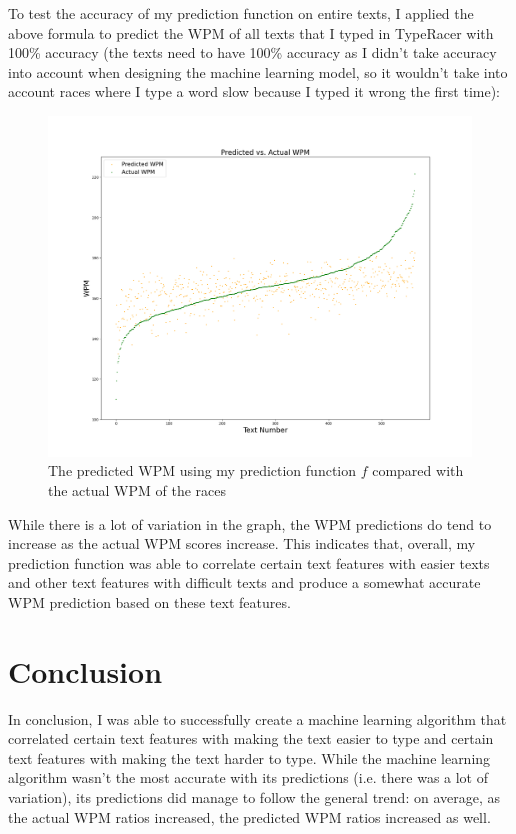 \documentclass[12pt]{article}
\begin{document}
To test the accuracy of my prediction function on entire texts, I applied the above formula to predict the WPM of all texts that I typed in TypeRacer with 100\% accuracy (the texts need to have 100\% accuracy as I didn't take accuracy into account when designing the machine learning model, so it wouldn't take into account races where I type a word slow because I typed it wrong the first time):

\begin{figure}[H]
	\caption{The predicted WPM using my prediction function $f$ compared with the actual WPM of the races}
	\includegraphics[width=\textwidth]{predicted-vs-actual-wpm.png}
\end{figure}

While there is a lot of variation in the graph, the WPM predictions do tend to increase as the actual WPM scores increase. This indicates that, overall, my prediction function was able to correlate certain text features with easier texts and other text features with difficult texts and produce a somewhat accurate WPM prediction based on these text features.

\section*{Conclusion}

In conclusion, I was able to successfully create a machine learning algorithm that correlated certain text features with making the text easier to type and certain text features with making the text harder to type. While the machine learning algorithm wasn't the most accurate with its predictions (i.e. there was a lot of variation), its predictions did manage to follow the general trend: on average, as the actual WPM ratios increased, the predicted WPM ratios increased as well.
\end{document}
